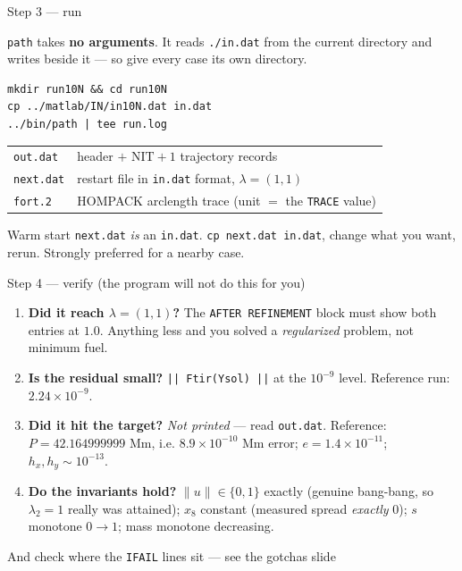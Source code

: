 \documentclass[10pt,aspectratio=169]{beamer}
\newcommand{\code}[1]{\texttt{\small #1}}
\newcommand{\file}[1]{\texttt{\small #1}}
\begin{document}
\begin{frame}[fragile]{Step 3 --- run}

\code{path} takes \textbf{no arguments}. It reads \file{./in.dat} from the
current directory and writes beside it --- so give every case its own
directory.

\begin{lstlisting}
mkdir run10N && cd run10N
cp ../matlab/IN/in10N.dat in.dat
../bin/path | tee run.log
\end{lstlisting}

\begin{center}\small
\begin{tabular}{@{}ll@{}}
\toprule
\file{out.dat} & header $+$ $\mathrm{NIT}+1$ trajectory records\\
\file{next.dat} & restart file in \file{in.dat} format, $\lambda = (1,1)$\\
\file{fort.2} & HOMPACK arclength trace (unit $=$ the \code{TRACE} value)\\
\bottomrule
\end{tabular}
\end{center}

\begin{block}{Warm start}
\file{next.dat} \emph{is} an \file{in.dat}. \code{cp next.dat in.dat}, change
what you want, rerun. Strongly preferred for a nearby case.
\end{block}
\end{frame}

\begin{frame}{Step 4 --- verify (the program will not do this for you)}

\begin{enumerate}
\item \textbf{Did it reach $\lambda = (1,1)$?} The \code{AFTER REFINEMENT}
      block must show both entries at $1.0$. Anything less and you solved a
      \emph{regularized} problem, not minimum fuel.
\item \textbf{Is the residual small?} \code{|| Ftir(Ysol) ||} at the
      $10^{-9}$ level. Reference run: $2.24\times10^{-9}$.
\item \textbf{Did it hit the target?} \emph{Not printed} --- read
      \file{out.dat}. Reference: $P = 42.164999999$ Mm, i.e.
      $8.9\times10^{-10}$ Mm error; $e = 1.4\times10^{-11}$;
      $h_x,h_y \sim 10^{-13}$.
\item \textbf{Do the invariants hold?} $\|u\| \in \{0,1\}$ exactly (genuine
      bang-bang, so $\lambda_2 = 1$ really was attained); $x_8$ constant
      (measured spread \emph{exactly} $0$); $s$ monotone $0\to1$; mass
      monotone decreasing.
\end{enumerate}

\begin{alertblock}{And check where the \code{IFAIL} lines sit --- see the
gotchas slide}
\end{alertblock}
\end{frame}
\end{document}
